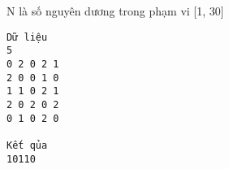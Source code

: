 N là số nguyên dương trong phạm vi [1, 30]
\begin{verbatim}
Dữ liệu
5
0 2 0 2 1 
2 0 0 1 0 
1 1 0 2 1 
2 0 2 0 2 
0 1 0 2 0

Kết qủa
10110

\end{verbatim}